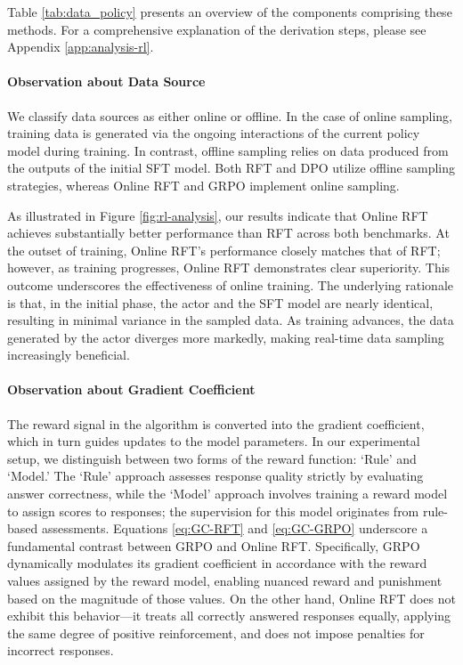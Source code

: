 \begin{itemize}[topsep=0pt]
Table \ref{tab:data_policy} presents an overview of the components comprising these methods. For a comprehensive explanation of the derivation steps, please see Appendix \ref{app:analysis-rl}.

\paragraph{Observation about Data Source} We classify data sources as either online or offline. In the case of online sampling, training data is generated via the ongoing interactions of the current policy model during training. In contrast, offline sampling relies on data produced from the outputs of the initial SFT model. Both RFT and DPO utilize offline sampling strategies, whereas Online RFT and GRPO implement online sampling.

As illustrated in Figure \ref{fig:rl-analysis}, our results indicate that Online RFT achieves substantially better performance than RFT across both benchmarks. At the outset of training, Online RFT's performance closely matches that of RFT; however, as training progresses, Online RFT demonstrates clear superiority. This outcome underscores the effectiveness of online training. The underlying rationale is that, in the initial phase, the actor and the SFT model are nearly identical, resulting in minimal variance in the sampled data. As training advances, the data generated by the actor diverges more markedly, making real-time data sampling increasingly beneficial.

\paragraph{Observation about Gradient Coefficient} The reward signal in the algorithm is converted into the gradient coefficient, which in turn guides updates to the model parameters. In our experimental setup, we distinguish between two forms of the reward function: `Rule' and `Model.' The `Rule' approach assesses response quality strictly by evaluating answer correctness, while the `Model' approach involves training a reward model to assign scores to responses; the supervision for this model originates from rule-based assessments. Equations \ref{eq:GC-RFT} and \ref{eq:GC-GRPO} underscore a fundamental contrast between GRPO and Online RFT. Specifically, GRPO dynamically modulates its gradient coefficient in accordance with the reward values assigned by the reward model, enabling nuanced reward and punishment based on the magnitude of those values. On the other hand, Online RFT does not exhibit this behavior—it treats all correctly answered responses equally, applying the same degree of positive reinforcement, and does not impose penalties for incorrect responses.


\end{itemize}
